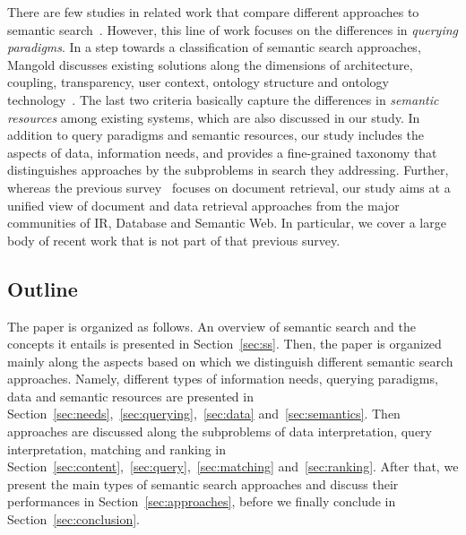 There are few studies in related work that compare different approaches to semantic search~\cite{DBLP:conf/semweb/KaufmannB07,DBLP:conf/esws/TranMH10}. However, this line of work focuses on the differences in \emph{querying paradigms}. In a step towards a classification of semantic search approaches, Mangold discusses existing solutions along the dimensions of architecture, coupling, transparency, user context, ontology structure and ontology technology~\cite{DBLP:journals/ijmso/Mangold07}. The last two criteria basically capture the differences in \emph{semantic resources} among existing systems, which are also discussed in our study. In addition to query paradigms and semantic resources, our study includes the aspects of data, information needs, and provides a fine-grained taxonomy that distinguishes approaches by the subproblems in search they addressing. Further, whereas the previous survey~\cite{DBLP:journals/ijmso/Mangold07} focuses on document retrieval, our study aims at a unified view of document and data retrieval approaches from the major communities of IR, Database and Semantic Web. In particular, we cover a large body of recent work that is not part of that previous survey.  


 


\subsection{Outline}
The paper is organized as follows. An overview of semantic search and the concepts it entails is presented in Section~\ref{sec:ss}. Then, the paper is organized mainly along the aspects based on which we distinguish different semantic search approaches. Namely, different types of information needs, querying paradigms, data and semantic resources are presented in Section~\ref{sec:needs},~\ref{sec:querying},~\ref{sec:data} and~\ref{sec:semantics}. Then approaches are discussed along the subproblems of data interpretation, query interpretation, matching and ranking in Section~\ref{sec:content},~\ref{sec:query},~\ref{sec:matching} and~\ref{sec:ranking}. After that, we present the main types of semantic search approaches and discuss their performances in Section~\ref{sec:approaches}, 
before we finally conclude in Section~\ref{sec:conclusion}.